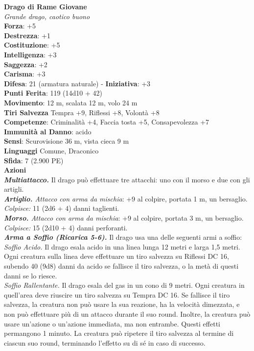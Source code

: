 \begin{multicols}{2}
\medskip\textbf{Drago di Rame Giovane}\\
\emph{Grande drago, caotico buono}\\
\textbf{Forza}: +5\\
\textbf{Destrezza}: +1\\
\textbf{Costituzione}: +5\\
\textbf{Intelligenza}: +3\\
\textbf{Saggezza}: +2\\
\textbf{Carisma}: +3\\
\textbf{Difesa}: 21 (armatura naturale) - \textbf{Iniziativa}: +3\\
\textbf{Punti Ferita}: 119 (14d10 + 42)\\
\textbf{Movimento}: 12 m, scalata 12 m, volo 24 m\\
\textbf{Tiri Salvezza} Tempra +9, Riflessi +8, Volontà +8\\
\textbf{Competenze}: Criminalità +4, Faccia tosta +5, Consapevolezza +7\\
\textbf{Immunità al Danno}: acido\\
\textbf{Sensi}: Scurovisione 36 m, vista cieca 9 m\\
\textbf{Linguaggi} Comune, Draconico\\
\textbf{Sfida}: 7 (2.900 PE)\smallskip\\
\smallskip\textbf{Azioni}\\
\emph{\textbf{Multiattacco.}} Il drago può effettuare tre attacchi: uno con il morso e due con gli artigli.\\
\emph{\textbf{Artiglio.} Attacco con arma da mischia}: +9 al colpire, portata 1 m, un bersaglio.\\
\emph{Colpisce:} 11 (2d6 + 4) danni taglienti.\\
\emph{\textbf{Morso.} Attacco con arma da mischia}: +9 al colpire, portata 3 m, un bersaglio.\\
\emph{Colpisce:} 15 (2d10 + 4) danni perforanti.\\
\emph{\textbf{Arma a Soffio (Ricarica 5-6).}} Il drago usa una delle seguenti armi a soffio:\\
\emph{Soffio Acido.} Il drago esala acido in una linea lunga 12 metri e larga 1,5 metri. Ogni creatura sulla linea deve effettuare un tiro salvezza su Riflessi DC  16, subendo 40 (9d8) danni da acido se fallisce il tiro salvezza, o la metà di questi danni se lo riesce.\\
\emph{Soffio Rallentante.} Il drago esala del gas in un cono di 9 metri. Ogni creatura in quell'area deve riuscire un tiro salvezza su Tempra DC  16. Se fallisce il tiro salvezza, la creatura non può usare la sua reazione, ha la velocità dimezzata, e non può effettuare più di un attacco durante il suo round. Inoltre, la creatura può usare un'azione o un'azione immediata, ma non entrambe. Questi effetti permangono 1 minuto. La creatura può ripetere il tiro salvezza al termine di ciascun suo round, terminando l'effetto su di sé in caso di successo.\\

\end{multicols}
